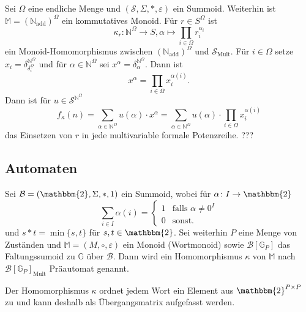 \documentclass{article}
\begin{document}
\begin{example}
  Sei $\Omega$ eine endliche Menge
  und $(\mathcal{S}, \Sigma, \ast, \varepsilon)$ ein Summoid.
  Weiterhin ist $\mathbb{M} = (\mathbb{N}_\text{add})^\Omega$ ein kommutatives Monoid.
  Für $r \in S^\Omega$ ist 
  \begin{equation*}
    \kappa_r \colon \mathbb{N}^\Omega \to S, \alpha \mapsto \prod_{i \in \Omega}r_i^{\alpha_i}
  \end{equation*}
  ein Monoid-Homomorphismus zwischen $(\mathbb{N}_\text{add})^\Omega$ und $\mathcal{S}_\text{Mult}$.
  Für $i \in \Omega$ setze $x_i = \delta^{\mathbb{N}^\Omega}_{\delta^\Omega_i}$
  und für $\alpha \in \mathbb{N}^\Omega$ sei $x^\alpha = \delta^{\mathbb{N}^\Omega}_\alpha$.
  Dann ist
  \begin{equation*}
    x^\alpha = \prod_{i \in \Omega}x_i^{\alpha(i)}.
  \end{equation*}
  Dann ist für $u \in \mathcal{S}^{\mathbb{N}^\Omega}$
  \begin{equation*}
    f_\kappa(n) = \sum_{\alpha \in \mathbb{N}^\Omega}u(\alpha) \cdot x^\alpha = \sum_{\alpha \in \mathbb{N}^\Omega}u(\alpha)\cdot \prod_{i \in \Omega}x_i^{\alpha(i)}
  \end{equation*}
  das Einsetzen von $r$ in jede multivariable formale Potenzreihe.
  ???
\end{example}

\subsection{Automaten}

\begin{definition}\label{Definition_Preautomat}
  Sei $\mathcal{B} = (\mathbbm{2}, \Sigma, \ast, 1)$ ein Summoid,
  wobei für $\alpha \colon I \to \mathbbm{2}$
  \begin{equation*}
    \sum_{i \in I}\alpha(i) = 
    \begin{cases}
      1 & \text{falls } \alpha \neq 0^I \\
      0 & \text{sonst.}
    \end{cases}
  \end{equation*}
  und $s \ast t = \min \{s, t\}$ für $s, t \in \mathbbm{2}$.
  Sei weiterhin $P$ eine Menge von Zuständen 
  und $\mathbb{M} = (M, \circ, \varepsilon)$ ein Monoid (Wortmonoid)
  sowie $\mathcal{B}[\mathbb{G}_P]$ das Faltungssumoid zu $\mathbb{G}$ über $\mathcal{B}$.
  Dann wird ein Homomorphismus $\kappa$ von $\mathbb{M}$ nach $\mathcal{B}[\mathbb{G}_P]_\text{Mult}$ Präautomat genannt.

  Der Homomorphismus $\kappa$ ordnet jedem Wort ein Element aus $\mathbbm{2}^{P \times P}$ zu
  und kann deshalb als Übergangsmatrix aufgefasst werden.
\end{definition}
\end{document}

